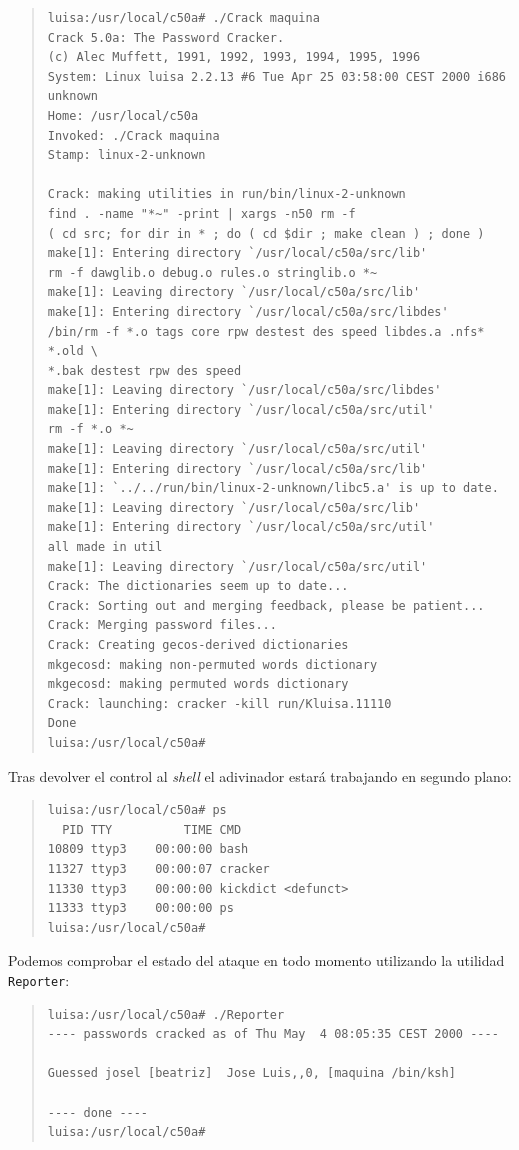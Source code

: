 \begin{quote}
\begin{verbatim}
luisa:/usr/local/c50a# ./Crack maquina
Crack 5.0a: The Password Cracker.
(c) Alec Muffett, 1991, 1992, 1993, 1994, 1995, 1996
System: Linux luisa 2.2.13 #6 Tue Apr 25 03:58:00 CEST 2000 i686 unknown
Home: /usr/local/c50a
Invoked: ./Crack maquina
Stamp: linux-2-unknown

Crack: making utilities in run/bin/linux-2-unknown
find . -name "*~" -print | xargs -n50 rm -f
( cd src; for dir in * ; do ( cd $dir ; make clean ) ; done )
make[1]: Entering directory `/usr/local/c50a/src/lib'
rm -f dawglib.o debug.o rules.o stringlib.o *~
make[1]: Leaving directory `/usr/local/c50a/src/lib'
make[1]: Entering directory `/usr/local/c50a/src/libdes'
/bin/rm -f *.o tags core rpw destest des speed libdes.a .nfs* *.old \
*.bak destest rpw des speed
make[1]: Leaving directory `/usr/local/c50a/src/libdes'
make[1]: Entering directory `/usr/local/c50a/src/util'
rm -f *.o *~
make[1]: Leaving directory `/usr/local/c50a/src/util'
make[1]: Entering directory `/usr/local/c50a/src/lib'
make[1]: `../../run/bin/linux-2-unknown/libc5.a' is up to date.
make[1]: Leaving directory `/usr/local/c50a/src/lib'
make[1]: Entering directory `/usr/local/c50a/src/util'
all made in util
make[1]: Leaving directory `/usr/local/c50a/src/util'
Crack: The dictionaries seem up to date...
Crack: Sorting out and merging feedback, please be patient...
Crack: Merging password files...
Crack: Creating gecos-derived dictionaries
mkgecosd: making non-permuted words dictionary
mkgecosd: making permuted words dictionary
Crack: launching: cracker -kill run/Kluisa.11110   
Done
luisa:/usr/local/c50a# 
\end{verbatim}
\end{quote}
Tras devolver el control al {\it shell} el adivinador estar\'a trabajando en
segundo plano:
\begin{quote}
\begin{verbatim}
luisa:/usr/local/c50a# ps   
  PID TTY          TIME CMD
10809 ttyp3    00:00:00 bash
11327 ttyp3    00:00:07 cracker
11330 ttyp3    00:00:00 kickdict <defunct>
11333 ttyp3    00:00:00 ps
luisa:/usr/local/c50a# 
\end{verbatim}
\end{quote}
Podemos comprobar el estado del ataque en todo momento utilizando la utilidad
{\tt Reporter}:
\begin{quote}
\begin{verbatim}
luisa:/usr/local/c50a# ./Reporter
---- passwords cracked as of Thu May  4 08:05:35 CEST 2000 ----

Guessed josel [beatriz]  Jose Luis,,0, [maquina /bin/ksh]

---- done ----
luisa:/usr/local/c50a# 
\end{verbatim}
\end{quote}
